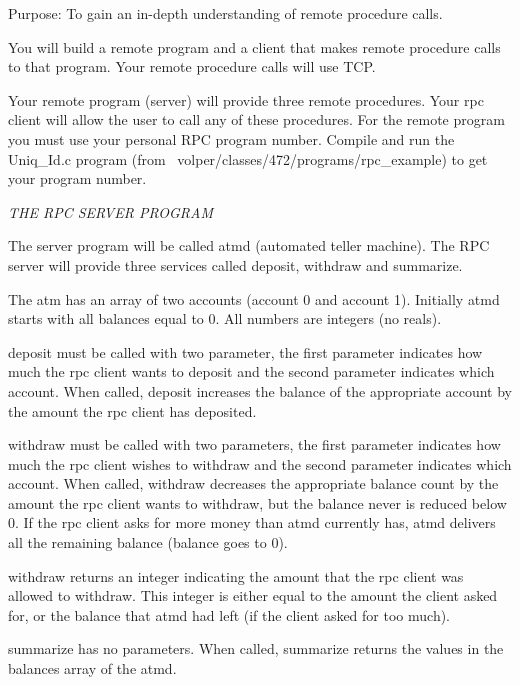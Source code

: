 

\parindent 0pt

Purpose: To gain an in-depth understanding of
remote procedure calls.

You will build a remote program and a client that makes remote procedure calls 
to that program.
Your remote procedure calls will use TCP.

Your remote program (server) will provide three remote procedures.
Your rpc client will allow the user to call any of these procedures.
For the remote program you must use your personal RPC program
number.
Compile and run the {\ltt{}Uniq_Id.c} program 
(from {\ltt{}~volper/classes/472/programs/rpc_example})
to get your program number.

\bigskip
\noindent
{\it THE RPC SERVER PROGRAM}

The server program will be called {\ltt{}atmd} (automated teller machine).
The RPC server will provide three services called 
{\ltt{}deposit}, {\ltt{}withdraw} and {\ltt{}summarize}.

The atm has an array of two accounts (account 0 and account 1).
Initially {\ltt{}atmd} starts with all balances equal to 0.
All numbers are integers (no reals).

{\ltt{}deposit} must be called with two parameter, the first parameter
indicates how much the rpc client wants to deposit and
the second parameter indicates which account.
When called, {\ltt{}deposit} increases the balance of the appropriate
account by the amount the rpc client has deposited.

{\ltt{}withdraw} must be called with two parameters, the first parameter
indicates how much the rpc client wishes to withdraw and
the second parameter indicates which account.
When called, {\ltt{}withdraw} decreases the appropriate balance count by the 
amount the rpc client wants to withdraw, but the balance never is reduced 
below 0.
If the rpc client asks for more money than {\ltt{}atmd} currently
has, {\ltt{}atmd} delivers all the remaining balance (balance goes to 0).

{\ltt{}withdraw} returns an integer indicating the amount that the
rpc client was allowed to withdraw.
This integer is either equal to the amount the client asked for, or the
balance that {\ltt{}atmd} had left (if the client asked for too much).

{\ltt{}summarize} has no parameters.
When called, {\ltt{}summarize} returns the values in the balances array of
the {\ltt{}atmd}.

